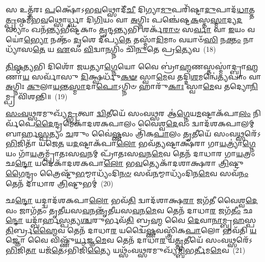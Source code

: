 𑌸 𑌉𑌤𑍍𑌤᳴𑌰𑌃 \ul{𑌪}\-𑌕𑍍𑌷𑍋᳴\-𑌽𑌭\-\ul{𑌵}\-𑌥𑍍𑌸𑍋𑌦𑍀᳴\-\ul{𑌚𑍀} 𑌦𑌿𑌗𑍍𑌯𑌾\-\ul{𑌮𑍁}\-𑌪𑌰𑌿᳴𑌷𑍍𑌟𑌾\-\ul{𑌦𑍁}\-𑌪𑌾𑌦᳴\-\ul{𑌧𑌾}\-𑌤𑍍𑌤\-\ul{𑌤𑍍𑌪𑍃}\-𑌷𑍍𑌠𑌮᳴𑌭\-\ul{𑌵}\-𑌥𑍍𑌸𑍋𑌰𑍍𑌧𑍍𑌵𑌾 𑌦𑌿\-\ul{𑌗𑌿}\-𑌯𑌂 𑌵𑌾 \ul{𑌅}\-𑌗𑍍𑌨𑌿𑌃 𑌪𑌞𑍍𑌚𑍇॑𑌷𑍍𑌟\-\ul{𑌕}\-𑌸𑍍𑌤\-\ul{𑌸𑍍𑌮𑌾}\-𑌦𑍍𑌯\-\ul{𑌦}\-𑌸𑍍𑌯𑌾𑌂 𑌖𑌨᳴\-\ul{𑌨𑍍𑌤𑍍𑌯}\-𑌭𑍀𑌷𑍍𑌟᳴𑌕𑌾𑌂 \ul{𑌤𑍃}\-𑌨𑍍𑌦\-\ul{𑌨𑍍𑌤𑍍𑌯}\-𑌭𑌿 𑌶𑌰𑍍𑌕᳴\-\ul{𑌰𑌾}\-\-\ul{𑍞} 𑌸\-\ul{𑌰𑍍𑌵𑌾} 𑌵𑌾 \ul{𑌇}\-𑌯𑌂 𑌵𑌯𑍋॑\-\ul{𑌭𑍍𑌯𑍋} 𑌨𑌕𑍍𑌤𑌂᳴ \ul{𑌦𑍃}\-𑌶𑍇 𑌦𑍀॑𑌪𑍍𑌯\-\ul{𑌤𑍇} 𑌤𑌸𑍍𑌮𑌾᳴\-\ul{𑌦𑌿}\-𑌮𑌾𑌂 𑌵𑌯𑌾𑍞᳴\-\ul{𑌸𑌿} 𑌨\-\ul{𑌕𑍍𑌤𑌂} 𑌨𑌾𑌧𑍍𑌯𑌾᳴𑌸\-\ul{𑌤𑍇} 𑌯 \ul{𑌏}\-𑌵𑌂 \ul{𑌵𑌿}\-𑌦𑍍𑌵𑌾\-\ul{𑌨}\-𑌗𑍍𑌨𑌿𑌂 𑌚𑌿᳴\-\ul{𑌨𑍁}\-𑌤𑍇 𑌪𑍍𑌰\-\ul{𑌤𑍍𑌯𑍇}\-𑌵~(18)

\-\ul{𑌤𑌿}\-\-\ul{𑌷𑍍𑌠}\-\-\ul{𑌤𑍍𑌯}\-𑌭𑌿 𑌦𑌿𑌶𑍋᳴ 𑌜𑌯𑌤𑍍𑌯𑌾\-\ul{𑌗𑍍𑌨𑍇}\-𑌯𑍋 𑌵𑍈 𑌬𑍍𑌰𑌾॑\-\ul{𑌹𑍍𑌮}\-𑌣𑌸𑍍𑌤𑌸𑍍𑌮𑌾॑𑌦𑍍𑌬𑍍𑌰𑌾\-\ul{𑌹𑍍𑌮}\-𑌣𑌾\-\ul{𑌯} 𑌸𑌰𑍍𑌵𑌾᳴𑌸𑍁 \ul{𑌦𑌿}\-𑌕𑍍𑌷𑍍𑌵𑌰𑍍𑌧𑍁᳴\-\ul{𑌕}\-\-\ul{𑍟} 𑌸𑍍𑌵𑌾\-\ul{𑌮𑍇}\-𑌵 𑌤𑌦𑍍𑌦𑌿\-\ul{𑌶}\-𑌮𑌨𑍍𑌵𑍇॑\-\ul{𑌤𑍍𑌯}\-𑌪𑌾𑌂 𑌵𑌾 \ul{𑌅}\-𑌗𑍍𑌨𑌿𑌃 \ul{𑌕𑍁}\-𑌲𑌾\-\ul{𑌯}\-𑌨𑍍𑌤\-\ul{𑌸𑍍𑌮𑌾}\-𑌦𑌾\-\ul{𑌪𑍋}\-\-𑌽𑌗𑍍𑌨𑌿𑍞 𑌹𑌾𑌰𑍁᳴\-\ul{𑌕𑌾𑌃} 𑌸𑍍𑌵𑌾\-\ul{𑌮𑍇}\-𑌵 𑌤𑌦𑍍𑌯𑍋\-\ul{𑌨𑌿}\-𑌮𑍍𑌪𑍍𑌰 𑌵𑌿᳴𑌶𑌨𑍍𑌤𑌿॥~(19)

{\anuvakamend[{𑌯𑌦᳴𑌲𑍇𑌲𑌾\-\ul{𑌯}\-𑌥𑍍𑌸 𑌉᳴𑌤𑍍𑌤\-\ul{𑌰}\-𑌤 \ul{𑌉}\-𑌪𑌾𑌦᳴𑌧𑌾\-\ul{𑌦𑍇}\-𑌵 𑌦𑍍𑌵𑌾𑌤𑍍𑌰𑌿𑍞᳴𑌶𑌚𑍍𑌚}]}%

\-\ul{𑌸𑌂}\-\-\ul{𑌵}\-\-\ul{𑌥𑍍𑌸}\-𑌰𑌮𑍁𑌖𑍍𑌯᳴\-\ul{𑌮𑍍𑌭𑍃}\-𑌤𑍍𑌵𑌾 \ul{𑌦𑍍𑌵𑌿}\-𑌤𑍀𑌯𑍇᳴ 𑌸𑌂𑌵\-\ul{𑌥𑍍𑌸}\-𑌰 𑌆॑\-\ul{𑌗𑍍𑌨𑍇}\-𑌯\-\ul{𑌮}\-𑌷𑍍𑌟𑌾\-𑌕᳴𑌪𑌾\-\ul{𑌲𑌂} 𑌨𑌿𑌰𑍍𑌵᳴𑌪𑍇\-\ul{𑌦𑍈}\-𑌨𑍍𑌦𑍍𑌰𑌮𑍇𑌕𑌾᳴\-𑌦𑌶\-𑌕𑌪𑌾𑌲𑌂 𑌵𑍈𑌶𑍍𑌵\-\ul{𑌦𑍇}\-𑌵𑌂 𑌦𑍍𑌵𑌾𑌦᳴𑌶\-𑌕𑌪𑌾𑌲𑌮𑍍 𑌬𑌾𑌰𑍍\mbox{}𑌹\-\ul{𑌸𑍍𑌪}\-𑌤𑍍𑌯𑌂 \ul{𑌚}\-𑌰𑍁𑌂 𑌵𑍈॑\-\ul{𑌷𑍍𑌣}\-𑌵𑌂 𑌤𑍍𑌰𑌿᳴𑌕\-\ul{𑌪𑌾}\-𑌲𑌂 \ul{𑌤𑍃}\-𑌤𑍀𑌯𑍇᳴ 𑌸𑌂𑌵\-\ul{𑌥𑍍𑌸}\-𑌰𑍇᳴\-𑌽\-\ul{𑌭𑌿}\-𑌜𑌿𑌤𑌾᳴ 𑌯𑌜𑍇\-\ul{𑌤} 𑌯\-\ul{𑌦}\-𑌷𑍍𑌟𑌾𑌕᳴𑌪𑌾\-\ul{𑌲𑍋} 𑌭𑌵᳴\-\ul{𑌤𑍍𑌯}\-𑌷𑍍𑌟𑌾𑌕𑍍𑌷᳴𑌰𑌾 𑌗𑌾\-\ul{𑌯}\-𑌤𑍍𑌰𑍍𑌯𑌾॑\-\ul{𑌗𑍍𑌨𑍇}\-𑌯𑌂 𑌗𑌾᳴\-\ul{𑌯}\-𑌤𑍍𑌰𑌮𑍍𑌪𑍍𑌰𑌾᳴𑌤𑌃𑌸\-\ul{𑌵}\-𑌨𑌮𑍍 𑌪𑍍𑌰𑌾᳴𑌤𑌃𑌸\-\ul{𑌵}\-𑌨\-\ul{𑌮𑍇}\-𑌵 𑌤𑍇𑌨᳴ 𑌦𑌾𑌧𑌾𑌰 𑌗𑌾\-\ul{𑌯}\-𑌤𑍍𑌰𑌂 𑌛\-\ul{𑌨𑍍𑌦𑍋} 𑌯𑌦𑍇𑌕𑌾᳴\-𑌦𑌶\-𑌕𑌪𑌾\-\ul{𑌲𑍋} 𑌭\-\ul{𑌵}\-𑌤𑍍𑌯𑍇𑌕𑌾᳴\-𑌦𑌶𑌾𑌕𑍍𑌷𑌰𑌾 \ul{𑌤𑍍𑌰𑌿}\-𑌷𑍍𑌟𑍁\-\ul{𑌗𑍈}\-𑌨𑍍𑌦𑍍𑌰𑌂 𑌤𑍍𑌰𑍈𑌷𑍍𑌟𑍁᳴\-\ul{𑌭}\-𑌮𑍍𑌮𑌾𑌧𑍍𑌯𑌂᳴𑌦𑌿\-\ul{𑌨}\-\-\ul{𑍞} 𑌸𑌵᳴\-\ul{𑌨}\-𑌮𑍍𑌮𑌾𑌧𑍍𑌯𑌂᳴𑌦𑌿𑌨\-\ul{𑌮𑍇}\-𑌵 𑌸𑌵᳴\-\ul{𑌨𑌂} 𑌤𑍇𑌨᳴ 𑌦𑌾𑌧𑌾𑌰 \ul{𑌤𑍍𑌰𑌿}\-𑌷𑍍𑌟𑍁𑌭𑌮𑍍॑~(20)

𑌛\-\ul{𑌨𑍍𑌦𑍋} 𑌯𑌦𑍍𑌦𑍍𑌵𑌾𑌦᳴𑌶\-𑌕𑌪𑌾\-\ul{𑌲𑍋} 𑌭𑌵᳴\-\ul{𑌤𑌿} 𑌦𑍍𑌵𑌾𑌦᳴𑌶𑌾𑌕𑍍𑌷\-\ul{𑌰𑌾} 𑌜𑌗᳴𑌤𑍀 𑌵𑍈𑌶𑍍𑌵\-\ul{𑌦𑍇}\-𑌵𑌂 𑌜𑌾𑌗᳴𑌤𑌂 𑌤𑍃𑌤𑍀𑌯𑌸\-\ul{𑌵}\-𑌨𑌨𑍍𑌤𑍃᳴𑌤𑍀𑌯𑌸\-\ul{𑌵}\-𑌨\-\ul{𑌮𑍇}\-𑌵 𑌤𑍇𑌨᳴ 𑌦𑌾𑌧𑌾\-\ul{𑌰} 𑌜𑌗᳴\-\ul{𑌤𑍀𑌂} 𑌛\-\ul{𑌨𑍍𑌦𑍋} 𑌯𑌦𑍍𑌬𑌾᳴𑌰𑍍\mbox{}𑌹\-\ul{𑌸𑍍𑌪}\-𑌤𑍍𑌯\-\ul{𑌶𑍍𑌚}\-𑌰𑍁𑌰𑍍𑌭𑌵᳴\-\ul{𑌤𑌿} 𑌬𑍍𑌰\-\ul{𑌹𑍍𑌮} 𑌵𑍈 \ul{𑌦𑍇}\-𑌵𑌾\-\ul{𑌨𑌾}\-𑌮𑍍𑌬𑍃\-\ul{𑌹}\-𑌸𑍍𑌪\-\ul{𑌤𑌿}\-𑌰𑍍𑌬𑍍𑌰\-\ul{𑌹𑍍𑌮𑍈}\-𑌵 𑌤𑍇𑌨᳴ 𑌦𑌾𑌧𑌾\-\ul{𑌰} 𑌯𑌦𑍍𑌵𑍈॑\-\ul{𑌷𑍍𑌣}\-𑌵𑌸𑍍𑌤𑍍𑌰𑌿᳴𑌕\-\ul{𑌪𑌾}\-𑌲𑍋 𑌭𑌵᳴𑌤𑌿 \ul{𑌯}\-𑌜𑍍𑌞𑍋 𑌵𑍈 𑌵𑌿𑌷𑍍𑌣𑍁᳴\-\ul{𑌰𑍍𑌯}\-𑌜𑍍𑌞\-\ul{𑌮𑍇}\-𑌵 𑌤𑍇𑌨᳴ 𑌦𑌾𑌧𑌾\-\ul{𑌰} 𑌯\-\ul{𑌤𑍍𑌤𑍃}\-𑌤𑍀𑌯𑍇᳴ 𑌸𑌂𑌵\-\ul{𑌥𑍍𑌸}\-𑌰𑍇᳴\-𑌽\-\ul{𑌭𑌿}\-𑌜𑌿\-\ul{𑌤𑌾} 𑌯𑌜᳴\-\ul{𑌤𑍇}\-\-𑌽𑌭𑌿𑌜𑌿᳴\-\ul{𑌤𑍍𑌯𑍈} 𑌯𑌥𑍍𑌸𑌂᳴𑌵\-\ul{𑌥𑍍𑌸}\-𑌰𑌮𑍁𑌖𑍍𑌯᳴\-\ul{𑌮𑍍𑌬𑌿}\-𑌭\-\ul{𑌰𑍍𑌤𑍀}\-𑌮\-\ul{𑌮𑍇}\-𑌵~(21)


